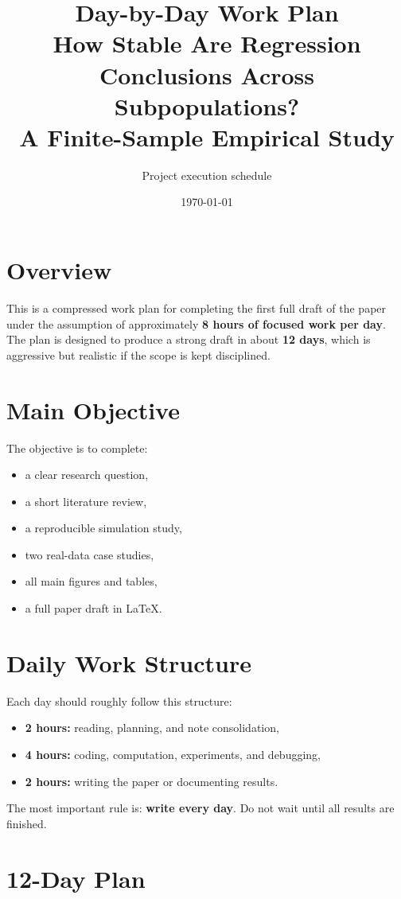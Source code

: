 \documentclass[11pt]{article}
\title{\textbf{Day-by-Day Work Plan}\\
How Stable Are Regression Conclusions Across Subpopulations?\\
A Finite-Sample Empirical Study}
\author{Project execution schedule}
\date{\today}
\begin{document}
\maketitle

\section{Overview}
This is a compressed work plan for completing the first full draft of the paper under the assumption of approximately \textbf{8 hours of focused work per day}. The plan is designed to produce a strong draft in about \textbf{12 days}, which is aggressive but realistic if the scope is kept disciplined.

\section{Main Objective}
The objective is to complete:
\begin{itemize}
    \item a clear research question,
    \item a short literature review,
    \item a reproducible simulation study,
    \item two real-data case studies,
    \item all main figures and tables,
    \item a full paper draft in LaTeX.
\end{itemize}

\section{Daily Work Structure}
Each day should roughly follow this structure:
\begin{itemize}
    \item \textbf{2 hours:} reading, planning, and note consolidation,
    \item \textbf{4 hours:} coding, computation, experiments, and debugging,
    \item \textbf{2 hours:} writing the paper or documenting results.
\end{itemize}

The most important rule is: \textbf{write every day}. Do not wait until all results are finished.

\section{12-Day Plan}
\end{document}
